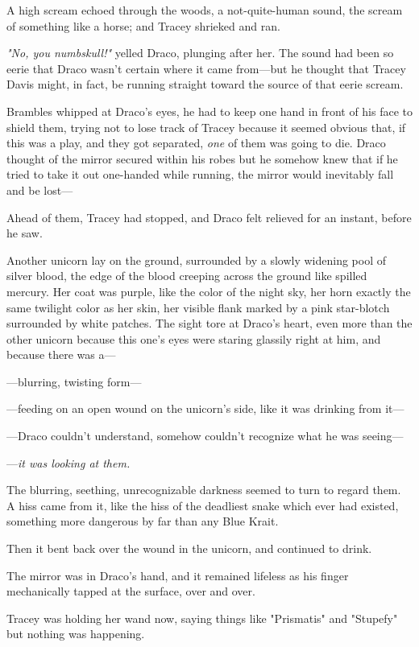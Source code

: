 A high scream echoed through the woods, a not-quite-human sound, the scream of
something like a horse; and Tracey shrieked and ran.

\emph{"No, you numbskull!"} yelled Draco, plunging after her. The sound had
been so eerie that Draco wasn't certain where it came from---but he thought
that Tracey Davis might, in fact, be running straight toward the source of that
eerie scream.

Brambles whipped at Draco's eyes, he had to keep one hand in front of his face
to shield them, trying not to lose track of Tracey because it seemed obvious
that, if this was a play, and they got separated, \emph{one} of them was going
to die. Draco thought of the mirror secured within his robes but he somehow
knew that if he tried to take it out one-handed while running, the mirror would
inevitably fall and be lost\mbox{---}

Ahead of them, Tracey had stopped, and Draco felt relieved for an instant,
before he saw.

Another unicorn lay on the ground, surrounded by a slowly widening pool of
silver blood, the edge of the blood creeping across the ground like spilled
mercury. Her coat was purple, like the color of the night sky, her horn exactly
the same twilight color as her skin, her visible flank marked by a pink
star-blotch surrounded by white patches. The sight tore at Draco's heart, even
more than the other unicorn because this one's eyes were staring glassily right
at him, and because there was a\mbox{---}

---blurring, twisting form\mbox{---}

---feeding on an open wound on the unicorn's side, like it was drinking from
it\mbox{---}

---Draco couldn't understand, somehow couldn't recognize what he was seeing\mbox{---}

---\emph{it was looking at them.}

The blurring, seething, unrecognizable darkness seemed to turn to regard them.
A hiss came from it, like the hiss of the deadliest snake which ever had
existed, something more dangerous by far than any Blue Krait.

Then it bent back over the wound in the unicorn, and continued to drink.

The mirror was in Draco's hand, and it remained lifeless as his finger
mechanically tapped at the surface, over and over.

Tracey was holding her wand now, saying things like "Prismatis" and "Stupefy"
but nothing was happening.

